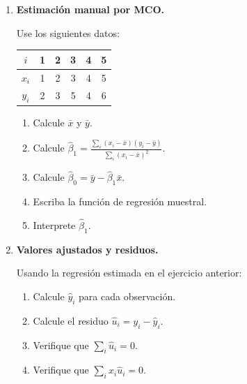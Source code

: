 \documentclass[11pt]{article}
\begin{document}
\begin{enumerate}[label=\textbf{Ejercicio \arabic*.}, leftmargin=*]
    \begin{enumerate}[label=\alph*)]
        \item Calcule $E[Y|X=10]$, $E[Y|X=12]$ y $E[Y|X=14]$.
        \item Dibuje intuitivamente la función de esperanza condicional.
        \item Si la FRP fuera lineal, ¿qué relación tendría con $E[Y|X]$?
    \end{enumerate}

    \item \textbf{Estimación manual por MCO.}
    
    Use los siguientes datos:
    
    \begin{center}
    \begin{tabular}{cccccc}
    \toprule
    $i$ & 1 & 2 & 3 & 4 & 5 \\
    \midrule
    $x_i$ & 1 & 2 & 3 & 4 & 5 \\
    $y_i$ & 2 & 3 & 5 & 4 & 6 \\
    \bottomrule
    \end{tabular}
    \end{center}
    
    \begin{enumerate}[label=\alph*)]
        \item Calcule $\bar{x}$ y $\bar{y}$.
        \item Calcule $\hat{\beta}_1=\frac{\sum_i(x_i-\bar{x})(y_i-\bar{y})}{\sum_i(x_i-\bar{x})^2}$.
        \item Calcule $\hat{\beta}_0=\bar{y}-\hat{\beta}_1\bar{x}$.
        \item Escriba la función de regresión muestral.
        \item Interprete $\hat{\beta}_1$.
    \end{enumerate}

    \item \textbf{Valores ajustados y residuos.}
    
    Usando la regresión estimada en el ejercicio anterior:
    \begin{enumerate}[label=\alph*)]
        \item Calcule $\hat{y}_i$ para cada observación.
        \item Calcule el residuo $\hat{u}_i=y_i-\hat{y}_i$.
        \item Verifique que $\sum_i \hat{u}_i=0$.
        \item Verifique que $\sum_i x_i\hat{u}_i=0$.
    \end{enumerate}


\end{enumerate}
\end{document}

